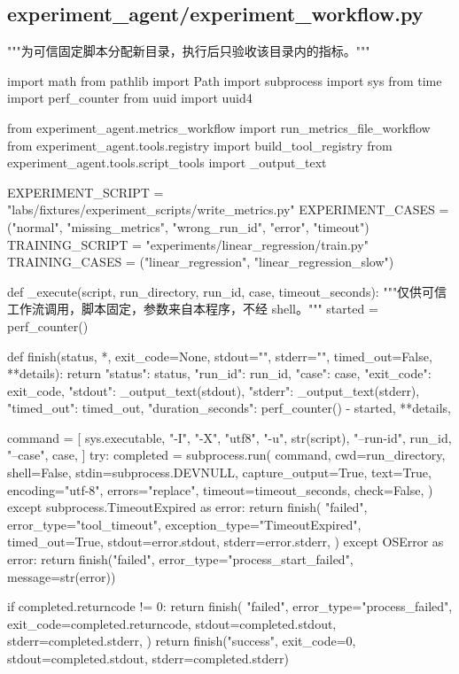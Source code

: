 \subsection{experiment\_agent/experiment\_workflow.py}

\begin{Code}
"""为可信固定脚本分配新目录，执行后只验收该目录内的指标。"""

import math
from pathlib import Path
import subprocess
import sys
from time import perf_counter
from uuid import uuid4

from experiment_agent.metrics_workflow import run_metrics_file_workflow
from experiment_agent.tools.registry import build_tool_registry
from experiment_agent.tools.script_tools import _output_text


EXPERIMENT_SCRIPT = "labs/fixtures/experiment_scripts/write_metrics.py"
EXPERIMENT_CASES = ("normal", "missing_metrics", "wrong_run_id", "error", "timeout")
TRAINING_SCRIPT = "experiments/linear_regression/train.py"
TRAINING_CASES = ("linear_regression", "linear_regression_slow")


def _execute(script, run_directory, run_id, case, timeout_seconds):
    """仅供可信工作流调用，脚本固定，参数来自本程序，不经 shell。"""
    started = perf_counter()

    def finish(status, *, exit_code=None, stdout="", stderr="", timed_out=False, **details):
        return {
            "status": status, "run_id": run_id, "case": case,
            "exit_code": exit_code, "stdout": _output_text(stdout),
            "stderr": _output_text(stderr), "timed_out": timed_out,
            "duration_seconds": perf_counter() - started, **details,
        }

    command = [
        sys.executable, "-I", "-X", "utf8", "-u", str(script),
        "--run-id", run_id, "--case", case,
    ]
    try:
        completed = subprocess.run(
            command, cwd=run_directory, shell=False, stdin=subprocess.DEVNULL,
            capture_output=True, text=True, encoding="utf-8", errors="replace",
            timeout=timeout_seconds, check=False,
        )
    except subprocess.TimeoutExpired as error:
        return finish(
            "failed", error_type="tool_timeout", exception_type="TimeoutExpired",
            timed_out=True, stdout=error.stdout, stderr=error.stderr,
        )
    except OSError as error:
        return finish("failed", error_type="process_start_failed", message=str(error))

    if completed.returncode != 0:
        return finish(
            "failed", error_type="process_failed", exit_code=completed.returncode,
            stdout=completed.stdout, stderr=completed.stderr,
        )
    return finish("success", exit_code=0, stdout=completed.stdout, stderr=completed.stderr)



\end{Code}
